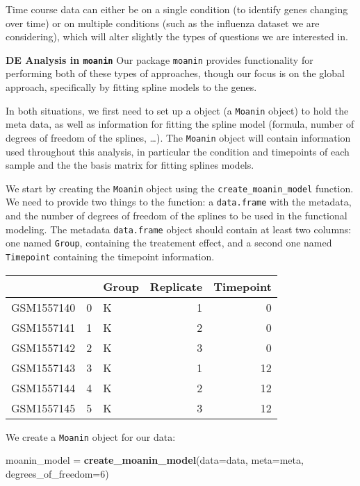 \documentclass[9pt,a4paper,]{extarticle}
\newenvironment{Shaded}{\begin{snugshade}}{\end{snugshade}}
\newcommand{\DataTypeTok}[1]{\textcolor[rgb]{0.13,0.29,0.53}{#1}}
\newcommand{\DecValTok}[1]{\textcolor[rgb]{0.00,0.00,0.81}{#1}}
\newcommand{\KeywordTok}[1]{\textcolor[rgb]{0.13,0.29,0.53}{\textbf{#1}}}
\newcommand{\NormalTok}[1]{#1}
\newcommand{\StringTok}[1]{\textcolor[rgb]{0.31,0.60,0.02}{#1}}
\begin{document}
Time course data can either be on a single condition (to identify genes
changing over time) or on multiple conditions (such as the influenza
dataset we are considering), which will alter slightly the types of questions
we are interested in.

\textbf{DE Analysis in \texttt{moanin}} Our package \texttt{moanin} provides functionality for performing both of
these types of approaches, though our focus is on the global approach, specifically by fitting spline models to the genes.

In both
situations, we first need to set up a object (a \texttt{Moanin} object) to
hold the meta data, as well as information for fitting the spline model
(formula, number of degrees of freedom of the splines, \ldots{}). The \texttt{Moanin} object
will contain information used
throughout this analysis, in particular the condition and timepoints of each sample and the
the basis matrix for fitting splines models.

We start by creating the \texttt{Moanin} object using the \texttt{create\_moanin\_model}
function. We need to provide two things to the function: a \texttt{data.frame} with
the metadata, and the number of degrees of freedom of the splines to be used in the
functional modeling. The metadata \texttt{data.frame} object should contain at least
two columns: one named \texttt{Group}, containing the treatement effect, and a
second one named \texttt{Timepoint} containing the timepoint information.

\begin{tabular}{l|r|l|r|r}
\hline
  &  & Group & Replicate & Timepoint\\
\hline
GSM1557140 & 0 & K & 1 & 0\\
\hline
GSM1557141 & 1 & K & 2 & 0\\
\hline
GSM1557142 & 2 & K & 3 & 0\\
\hline
GSM1557143 & 3 & K & 1 & 12\\
\hline
GSM1557144 & 4 & K & 2 & 12\\
\hline
GSM1557145 & 5 & K & 3 & 12\\
\hline
\end{tabular}

We create a \texttt{Moanin} object for our data:

\begin{Shaded}
\begin{Highlighting}[]
\NormalTok{moanin_model =}\StringTok{ }\KeywordTok{create_moanin_model}\NormalTok{(}\DataTypeTok{data=}\NormalTok{data, }\DataTypeTok{meta=}\NormalTok{meta,}
    \DataTypeTok{degrees_of_freedom=}\DecValTok{6}\NormalTok{)}
\end{Highlighting}
\end{Shaded}
\end{document}

